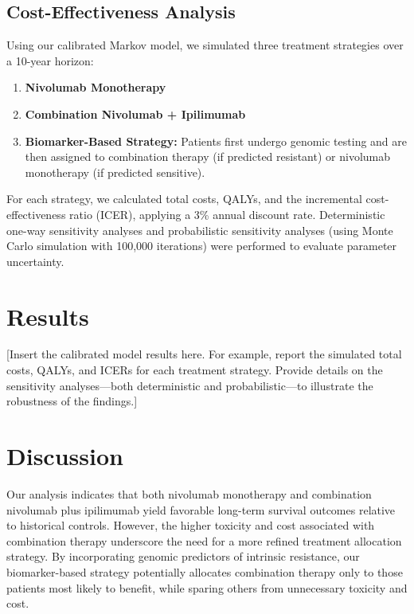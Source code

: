 \documentclass[preprint, 3p,
authoryear]{elsarticle} %
\begin{document}
\subsection{Cost-Effectiveness
Analysis}\label{cost-effectiveness-analysis}

Using our calibrated Markov model, we simulated three treatment
strategies over a 10-year horizon:

\begin{enumerate}
\def\labelenumi{\arabic{enumi}.}
\item
  \textbf{Nivolumab Monotherapy}
\item
  \textbf{Combination Nivolumab + Ipilimumab}
\item
  \textbf{Biomarker-Based Strategy:} Patients first undergo genomic
  testing and are then assigned to combination therapy (if predicted
  resistant) or nivolumab monotherapy (if predicted sensitive).
\end{enumerate}

For each strategy, we calculated total costs, QALYs, and the incremental
cost-effectiveness ratio (ICER), applying a 3\% annual discount rate.
Deterministic one-way sensitivity analyses and probabilistic sensitivity
analyses (using Monte Carlo simulation with 100,000 iterations) were
performed to evaluate parameter uncertainty.

\section{Results}\label{results}

{[}Insert the calibrated model results here. For example, report the
simulated total costs, QALYs, and ICERs for each treatment strategy.
Provide details on the sensitivity analyses---both deterministic and
probabilistic---to illustrate the robustness of the findings.{]}

\section{Discussion}\label{discussion}

Our analysis indicates that both nivolumab monotherapy and combination
nivolumab plus ipilimumab yield favorable long-term survival outcomes
relative to historical controls. However, the higher toxicity and cost
associated with combination therapy underscore the need for a more
refined treatment allocation strategy. By incorporating genomic
predictors of intrinsic resistance, our biomarker-based strategy
potentially allocates combination therapy only to those patients most
likely to benefit, while sparing others from unnecessary toxicity and
cost.
\end{document}
